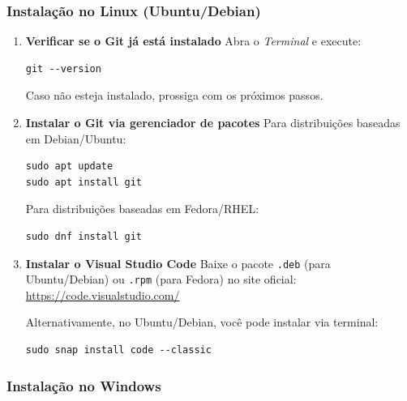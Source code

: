 \subsubsection*{Instalação no Linux (Ubuntu/Debian)}

\begin{enumerate}
    \item \textbf{Verificar se o Git já está instalado}  
    Abra o \textit{Terminal} e execute:
    \begin{lstlisting}[style=shellstyle]
git --version
    \end{lstlisting}
    Caso não esteja instalado, prossiga com os próximos passos.

    \item \textbf{Instalar o Git via gerenciador de pacotes}  
    Para distribuições baseadas em Debian/Ubuntu:
    \begin{lstlisting}[style=shellstyle]
sudo apt update
sudo apt install git
    \end{lstlisting}
    Para distribuições baseadas em Fedora/RHEL:
    \begin{lstlisting}[style=shellstyle]
sudo dnf install git
    \end{lstlisting}

    \item \textbf{Instalar o Visual Studio Code}  
    Baixe o pacote \texttt{.deb} (para Ubuntu/Debian) ou \texttt{.rpm} (para Fedora) no site oficial:  
    \url{https://code.visualstudio.com/}  

    Alternativamente, no Ubuntu/Debian, você pode instalar via terminal:
    \begin{lstlisting}[style=shellstyle]
sudo snap install code --classic
    \end{lstlisting}
\end{enumerate}

\subsubsection*{Instalação no Windows}

